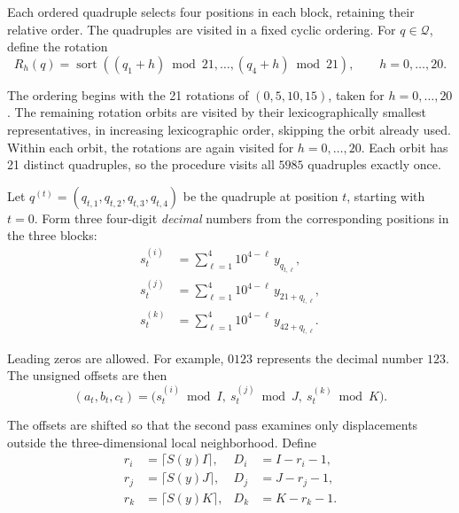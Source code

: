 \documentclass[12pt,a4paper]{article}
\begin{document}
\begin{enumerate}
	Each ordered quadruple selects four positions in each block, retaining their relative order. The quadruples are visited in a fixed cyclic ordering. For $q\in\mathcal{Q}$, define the rotation
	\begin{equation}
	R_h(q)=\operatorname{sort}\!\left((q_1+h)\bmod21,\ldots,(q_4+h)\bmod21\right),
	\qquad h=0,\ldots,20.
	\label{additional_connection_rotation}
	\end{equation}
	
	The ordering begins with the 21 rotations of $(0,5,10,15)$, taken for $h=0,\ldots,20$. The remaining rotation orbits are visited by their lexicographically smallest representatives, in increasing lexicographic order, skipping the orbit already used. Within each orbit, the rotations are again visited for $h=0,\ldots,20$. Each orbit has 21 distinct quadruples, so the procedure visits all $5985$ quadruples exactly once. 

	Let $q^{(t)}=(q_{t,1},q_{t,2},q_{t,3},q_{t,4})$ be the quadruple at position $t$, starting with $t=0$. Form three four-digit \emph{decimal} numbers from the corresponding positions in the three blocks:
	\begin{equation}
	\begin{aligned}
	 s_t^{(i)}&=\sum_{\ell=1}^{4}10^{4-\ell}\,y_{q_{t,\ell}},\\
	 s_t^{(j)}&=\sum_{\ell=1}^{4}10^{4-\ell}\,y_{21+q_{t,\ell}},\\
	 s_t^{(k)}&=\sum_{\ell=1}^{4}10^{4-\ell}\,y_{42+q_{t,\ell}}.
	\end{aligned}
	\label{additional_connection_decimal_numbers}
	\end{equation}
	
	Leading zeros are allowed. For example, $0123$ represents the decimal number $123$. The unsigned offsets are then
	\begin{equation}
	(a_t,b_t,c_t)=\big(s_t^{(i)}\bmod I,\ s_t^{(j)}\bmod J,\ s_t^{(k)}\bmod K\big).
	\label{additional_connection_raw_offsets}
	\end{equation}

	The offsets are shifted so that the second pass examines only displacements outside the three-dimensional local neighborhood. Define
	\begin{equation}
	\begin{aligned}
	 r_i&=\lceil S(y)I\rceil, &D_i&=I-r_i-1,\\
	 r_j&=\lceil S(y)J\rceil, &D_j&=J-r_j-1,\\
	 r_k&=\lceil S(y)K\rceil, &D_k&=K-r_k-1.
	\end{aligned}
	\label{additional_connection_radii}
	\end{equation}


\end{enumerate}
\end{document}
